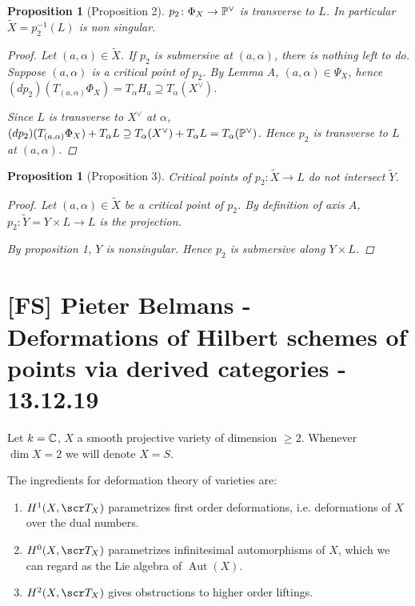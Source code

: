 \documentclass[A4paper, british]{amsart}
\theoremstyle{darkgreentheorem}
\newtheorem{prop}[thm]{Proposition}
\theoremstyle{darkbluedefinition}
\theoremstyle{darkredexample}
\theoremstyle{remark}
\DeclareMathOperator{\Aut}{Aut}
\newcommand{\1}{\mathbbm{1}}
\newcommand{\dual}{^{\vee}}
\begin{document}
\begin{prop}[Proposition 2]
    $p_{2}\colon \Phi_{X}\to \P\dual$ is transverse to $L$.
    In particular $\tilde{X}=p_{2}^{-1}(L)$ is non singular.
    \begin{proof}
	Let $(a,\alpha)\in \tilde{X}$.
	If $p_{2}$ is submersive at $(a,\alpha)$, there is nothing left to do.
	Suppose $(a,\alpha)$ is a critical point of $p_{2}$.
	By Lemma A, $(a,\alpha)\in \Psi_{X}$, hence $(dp_{2})(T_{(a,\alpha)}\Phi_{X})=T_{\alpha}H_{a}\supseteq T_{\alpha}(X\dual)$.

	Since $L$ is transverse to $X\dual$ at $\alpha$, $(dp_{2})(T_{(a,\alpha)}\Phi_{X})+T_{\alpha}L\supseteq T_{\alpha}(X\dual)+T_{\alpha}L=T_{\alpha}(\P\dual)$.
	Hence $p_{2}$ is transverse to $L$ at $(a,\alpha)$.
    \end{proof}
\end{prop}

\begin{prop}[Proposition 3]
    Critical points of $p_{2}\colon \tilde{X}\to L$ do not intersect $\tilde{Y}$.
    \begin{proof}
	Let $(a,\alpha)\in \tilde{X}$ be a critical point of $p_{2}$.
	By definition of axis $A$, $p_{2}\colon \tilde{Y}=Y\times L\to L$ is the projection.

	By proposition 1, $Y$ is nonsingular.
	Hence $p_{2}$ is submersive along $Y\times L$.
    \end{proof}
\end{prop}

\section{[FS] Pieter Belmans - Deformations of Hilbert schemes of points via derived categories - 13.12.19}

Let $k=\mathbb{C}$, $X$ a smooth projective variety of dimension $\geqslant 2$.
Whenever $\dim{X}=2$ we will denote $X=S$.

The ingredients for deformation theory of varieties are:
\begin{enumerate}
    \item $H^{1}(X,\sT_{X})$ parametrizes first order deformations, i.e. deformations of $X$ over the dual numbers.
    \item $H^{0}(X,\sT_{X})$ parametrizes infinitesimal automorphisms of $X$, which we can regard as the Lie algebra of $\Aut(X)$.
    \item $H^{2}(X,\sT_{X})$ gives obstructions to higher order liftings.
\end{enumerate}
\end{document}
